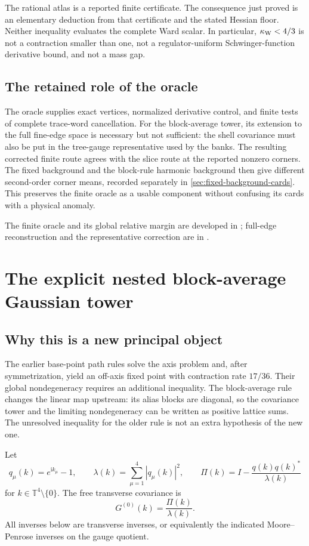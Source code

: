 \documentclass[11pt,oneside,openany]{book}
\theoremstyle{definition}
\theoremstyle{remark}
\newcommand{\T}{\mathbb T}
\newcommand{\ii}{\mathrm i}
\newcommand{\src}[2]{\cite[#2]{#1}}
\newcommand{\sourcebasis}[1]{\par\smallskip\noindent #1\par}
\begin{document}
The rational atlas is a reported finite certificate. The consequence just proved is an elementary deduction from that certificate and the stated Hessian floor. Neither inequality evaluates the complete Ward scalar. In particular, $\kappa_{\rm W}<4/3$ is not a contraction smaller than one, not a regulator-uniform Schwinger-function derivative bound, and not a mass gap.

\section{The retained role of the oracle}
The oracle supplies exact vertices, normalized derivative control, and
finite tests of complete trace-word cancellation. For the block-average
tower, its extension to the full fine-edge space is necessary but not
sufficient: the shell covariance must also be put in the tree-gauge
representative used by the banks. The resulting corrected finite route
agrees with the slice route at the reported nonzero corners. The fixed
background and the block-rule harmonic background then give different
second-order corner means, recorded separately in
\cref{sec:fixed-background-cards}. This preserves the finite oracle as a
usable component without confusing its cards with a physical anomaly.
\sourcebasis{The finite oracle and its global relative margin are
developed in \cite{F9,F10}; full-edge reconstruction and the representative
correction are in \src{F11}{V39, V41}.}

\chapter{The explicit nested block-average Gaussian tower}
\label{ch:tower}
\section{Why this is a new principal object}
The earlier base-point path rules solve the axis problem and, after symmetrization, yield an off-axis fixed point with contraction rate $17/36$. Their global nondegeneracy requires an additional inequality. The block-average rule changes the linear map upstream: its alias blocks are diagonal, so the covariance tower and the limiting nondegeneracy can be written as positive lattice sums. The unresolved inequality for the older rule is not an extra hypothesis of the new one. \src{F11}{V32--V37}

Let
\begin{equation}\label{eq:qPi}
q_\mu(k)=e^{\ii k_\mu}-1,\qquad
\lambda(k)=\sum_{\mu=1}^{4}|q_\mu(k)|^2,
\qquad \Pi(k)=I-\frac{q(k)q(k)^*}{\lambda(k)}
\end{equation}
for $k\in\T^4\setminus\{0\}$. The free transverse covariance is
\[
G^{(0)}(k)=\frac{\Pi(k)}{\lambda(k)}.
\]
All inverses below are transverse inverses, or equivalently the indicated Moore--Penrose inverses on the gauge quotient.
\end{document}
